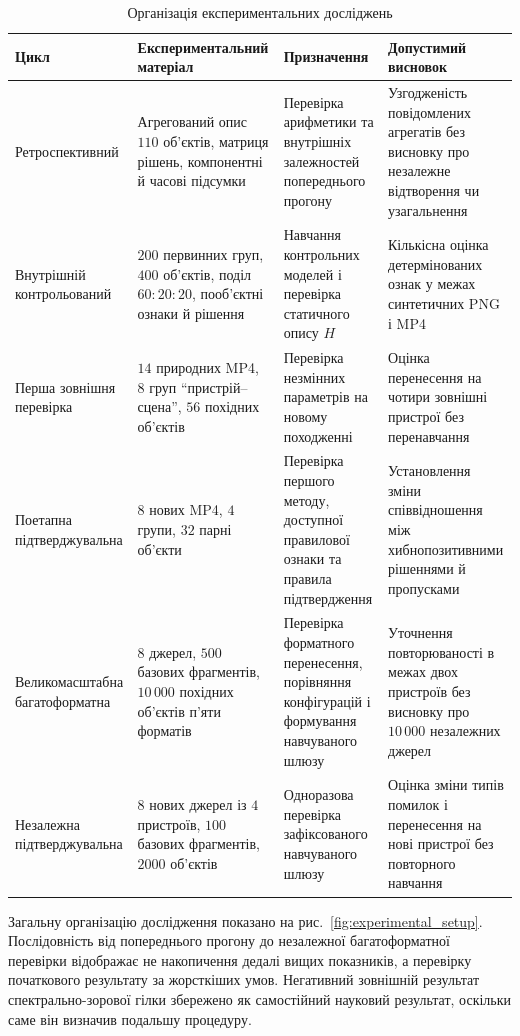 \begin{table}[htbp]
\caption{Організація експериментальних досліджень}
\label{tab:ch4_research_program}
\centering
\scriptsize
\begin{tabularx}{\textwidth}{p{}p{}Y Y}
\toprule
Цикл & Експериментальний матеріал & Призначення & Допустимий висновок \\
\midrule
Ретроспективний & Агрегований опис $110$ об’єктів, матриця рішень, компонентні й часові підсумки & Перевірка арифметики та внутрішніх залежностей попереднього прогону & Узгодженість повідомлених агрегатів без висновку про незалежне відтворення чи узагальнення \\
Внутрішній контрольований & $200$ первинних груп, $400$ об’єктів, поділ $60:20:20$, пооб’єктні ознаки й рішення & Навчання контрольних моделей і перевірка статичного опису $H$ & Кількісна оцінка детермінованих ознак у межах синтетичних PNG і MP4 \\
Перша зовнішня перевірка & $14$ природних MP4, $8$ груп ``пристрій--сцена'', $56$ похідних об’єктів & Перевірка незмінних параметрів на новому походженні & Оцінка перенесення на чотири зовнішні пристрої без перенавчання \\
Поетапна підтверджувальна & $8$ нових MP4, $4$ групи, $32$ парні об’єкти & Перевірка першого методу, доступної правилової ознаки та правила підтвердження & Установлення зміни співвідношення між хибнопозитивними рішеннями й пропусками \\
Великомасштабна багатоформатна & $8$ джерел, $500$ базових фрагментів, $10\,000$ похідних об’єктів п’яти форматів & Перевірка форматного перенесення, порівняння конфігурацій і формування навчуваного шлюзу & Уточнення повторюваності в межах двох пристроїв без висновку про $10\,000$ незалежних джерел \\
Незалежна підтверджувальна & $8$ нових джерел із $4$ пристроїв, $100$ базових фрагментів, $2000$ об’єктів & Одноразова перевірка зафіксованого навчуваного шлюзу & Оцінка зміни типів помилок і перенесення на нові пристрої без повторного навчання \\
\bottomrule
\end{tabularx}
\end{table}

Загальну організацію дослідження показано на рис.~\ref{fig:experimental_setup}. Послідовність від попереднього прогону до незалежної багатоформатної перевірки відображає не накопичення дедалі вищих показників, а перевірку початкового результату за жорсткіших умов. Негативний зовнішній результат спектрально-зорової гілки збережено як самостійний науковий результат, оскільки саме він визначив подальшу процедуру.


